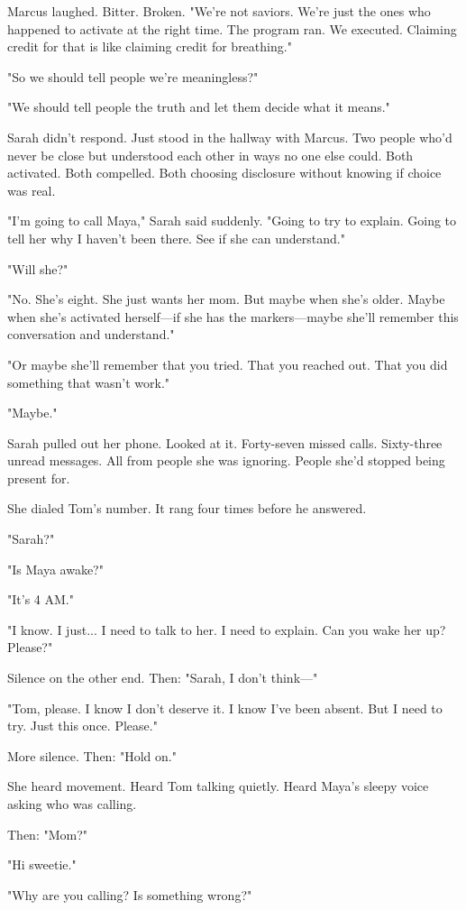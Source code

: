 Marcus laughed. Bitter. Broken. "We're not saviors. We're just the ones who happened to activate at the right time. The program ran. We executed. Claiming credit for that is like claiming credit for breathing."

"So we should tell people we're meaningless?"

"We should tell people the truth and let them decide what it means."

Sarah didn't respond. Just stood in the hallway with Marcus. Two people who'd never be close but understood each other in ways no one else could. Both activated. Both compelled. Both choosing disclosure without knowing if choice was real.

"I'm going to call Maya," Sarah said suddenly. "Going to try to explain. Going to tell her why I haven't been there. See if she can understand."

"Will she?"

"No. She's eight. She just wants her mom. But maybe when she's older. Maybe when she's activated herself—if she has the markers—maybe she'll remember this conversation and understand."

"Or maybe she'll remember that you tried. That you reached out. That you did something that wasn't work."

"Maybe."

Sarah pulled out her phone. Looked at it. Forty-seven missed calls. Sixty-three unread messages. All from people she was ignoring. People she'd stopped being present for.

She dialed Tom's number. It rang four times before he answered.

"Sarah?"

"Is Maya awake?"

"It's 4 AM."

"I know. I just... I need to talk to her. I need to explain. Can you wake her up? Please?"

Silence on the other end. Then: "Sarah, I don't think—"

"Tom, please. I know I don't deserve it. I know I've been absent. But I need to try. Just this once. Please."

More silence. Then: "Hold on."

She heard movement. Heard Tom talking quietly. Heard Maya's sleepy voice asking who was calling.

Then: "Mom?"

"Hi sweetie."

"Why are you calling? Is something wrong?"

